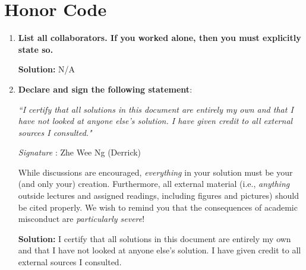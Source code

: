 \documentclass{article}
\newcommand{\Question}[1]{\Large \section{ #1 } \normalsize}
\newenvironment{solution}{\color{blue} \smallskip \textbf{Solution:}}{}
\begin{document}
\newpage
\Question{Honor Code}

\begin{enumerate}
    \item 
    \textbf{List all collaborators. If you worked alone, then you must explicitly state so.}

    \begin{solution}
        N/A
    \end{solution}

    \item
    \textbf{Declare and sign the following statement}: 
    
    \textit{``I certify that all solutions in this document are entirely my own and that I have not looked at anyone else's solution. I have given credit to all external sources I consulted."}
    
    \textit{Signature} : Zhe Wee Ng (Derrick)
    
    While discussions are encouraged, \emph{everything} in your solution must be your (and only your) creation. 
    Furthermore, all external material  (i.e., \emph{anything} outside lectures and assigned
    readings, including figures and pictures) should be cited properly.
    We wish to remind you that the consequences of academic misconduct are \emph{particularly severe}!

    \begin{solution}
        I certify that all solutions in this document are entirely my own and that I have not looked at anyone else's solution. I have given credit to all external sources I consulted.
    \end{solution}

\end{enumerate}
\end{document}
